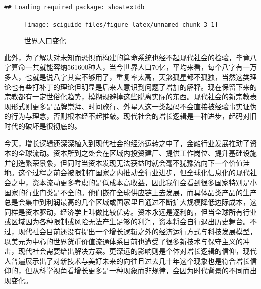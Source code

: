 \documentclass[]{tufte-book}
\newenvironment{Shaded}{}{}
\newcommand{\AttributeTok}[1]{\textcolor[rgb]{0.49,0.56,0.16}{#1}}
\newcommand{\CommentTok}[1]{\textcolor[rgb]{0.38,0.63,0.69}{\textit{#1}}}
\newcommand{\DecValTok}[1]{\textcolor[rgb]{0.25,0.63,0.44}{#1}}
\newcommand{\FunctionTok}[1]{\textcolor[rgb]{0.02,0.16,0.49}{#1}}
\newcommand{\NormalTok}[1]{#1}
\newcommand{\OtherTok}[1]{\textcolor[rgb]{0.00,0.44,0.13}{#1}}
\newcommand{\SpecialCharTok}[1]{\textcolor[rgb]{0.25,0.44,0.63}{#1}}
\newcommand{\StringTok}[1]{\textcolor[rgb]{0.25,0.44,0.63}{#1}}
\begin{document}
\begin{verbatim}
## Loading required package: showtextdb
\end{verbatim}

\begin{Shaded}
\end{Shaded}

\begin{figure}
\texttt{[image: sciguide\_files/figure-latex/unnamed-chunk-3-1]} \caption[世界人口变化]{世界人口变化}\label{fig:unnamed-chunk-3}
\end{figure}

此外，为了解决对未知而恐惧而构建的算命系统也经不起现代社会的检验，毕竟八字算命一共就能容纳561600种人，当今世界人口70亿，平均来看，每个八字有一万多人，也就是说八字其实不够用了，重复率太高，天煞孤星都不孤独，当然这类理论也有些打补丁的理论但明显是后来人意识到问题了增加的解释。现在保留下来的宗教都有一定世俗化趋势，模糊规避掉这些脱离实际的东西。现代社会的新宗教表现形式则更多是品牌崇拜、时间旅行、外星人这一类起码不会直接被经验事实证伪的行为与理念，否则根本经不起推敲。现代社会的增长逻辑是一种进步，起码对旧时代的破坏是很彻底的。

今天，增长逻辑还深深植入到现代社会的经济运转之中了，金融行业发展推动了资本的全球流动。资本所到之处会在区域内投资建厂、提供工作岗位、提升基础设施并创造繁荣景象，但同时当资本发现无法获益时就会毫不犹豫流向下一个价值洼地。这个过程之前会被限制在国家之内推动全行业进步，但全球化信息化的现代社会之中，资本流动更多考虑的是低成本高收益，因此我们会看到很多国家特别是小国家的行业门类是不全的。他们嵌在全球供应链上去发展，而具体品类产品的生产总是会集中到利润最高的几个区域或国家里且通过不断扩大规模降低边际成本，这同样是资本驱动，经济学上叫做比较优势。资本永远是逐利的，但当全球所有行业或区域因为各种限制或风险无法产生足够的利润，资本将会自行退出历史舞台。不过，现代社会目前还没有提出一个增长逻辑之外的经济运行方式与科技发展模型，以美元为中心的世界货币价值流通体系目前也遭受了很多新技术与保守主义的冲击，现代社会需要给出解决方案。更深远的影响则是个体对增长逻辑的信仰，现代人普遍展示出了对新技术与美好未来的向往且过去几十年这个现象也是符合增长信仰的，但从科学视角看增长更多是一种现象而非规律，会因为时代背景的不同而出现变化。
\end{document}
